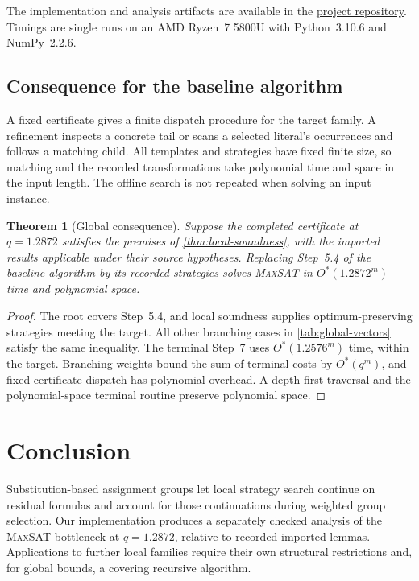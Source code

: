 \documentclass[11pt]{article}
\newcommand{\MaxSAT}{\textnormal{\textsc{MaxSAT}}}
\newcommand{\OhStar}{O^*}
\newtheorem{theorem}{Theorem}
\theoremstyle{definition}
\theoremstyle{remark}
\begin{document}
The implementation and analysis artifacts are available in the
\href{https://github.com/kisorimaD/maxsat_prover}{project repository}.
Timings are single runs on an AMD Ryzen~7 5800U with Python~3.10.6 and
NumPy~2.2.6.

\subsection{Consequence for the baseline algorithm}

A fixed certificate gives a finite dispatch procedure for the target family.
A refinement inspects a concrete tail or scans a selected literal's
occurrences and follows a matching child. All templates and strategies have
fixed finite size, so matching and the recorded transformations take
polynomial time and space in the input length. The offline search is not
repeated when solving an input instance.

\begin{theorem}[Global consequence]
\label{thm:conditional-global}
Suppose the completed certificate at $q=1.2872$ satisfies the premises of
\cref{thm:local-soundness}, with the imported results applicable under their
source hypotheses. Replacing Step~5.4 of the baseline algorithm by its
recorded strategies solves \MaxSAT{} in $\OhStar(1.2872^m)$ time and
polynomial space.
\end{theorem}
\begin{proof}
The root covers Step~5.4, and local soundness supplies optimum-preserving
strategies meeting the target. All other branching cases in
\cref{tab:global-vectors} satisfy the same inequality. The terminal
Step~7 uses $\OhStar(1.2576^m)$ time, within the target. Branching weights
bound the sum of terminal costs by $\OhStar(q^m)$, and fixed-certificate
dispatch has polynomial overhead. A depth-first traversal and the
polynomial-space terminal routine preserve polynomial space.
\end{proof}

\section{Conclusion}
\label{sec:conclusion}

Substitution-based assignment groups let local strategy search continue on
residual formulas and account for those continuations during weighted group
selection. Our implementation produces a separately checked analysis of the
\MaxSAT{} bottleneck at $q=1.2872$, relative to recorded imported lemmas.
Applications to further local families require their own structural
restrictions and, for global bounds, a covering recursive algorithm.
\end{document}

